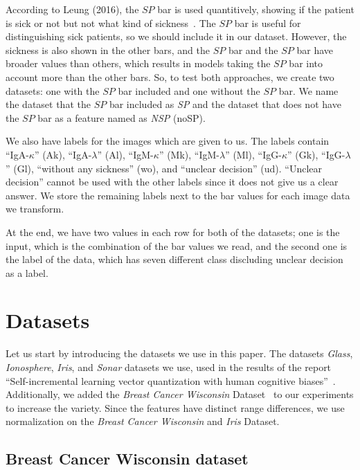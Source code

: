 According to Leung (2016), the $SP$ bar is used quantitively, showing if the patient is sick or not but not what kind of sickness~\cite{leung}. The $SP$ bar is useful for distinguishing sick patients, so we should include it in our dataset. However, the sickness is also shown in the other bars, and the $SP$ bar and the $SP$ bar have broader values than others, which results in models taking the $SP$ bar into account more than the other bars. So, to test both approaches, we create two datasets: one with the $SP$ bar included and one without the $SP$ bar. We name the dataset that the $SP$ bar included as \textit{SP} and the dataset that does not have the $SP$ bar as a feature named as \textit{NSP} (noSP).

We also have labels for the images which are given to us. The labels contain “IgA-$\kappa$” (Ak), “IgA-$\lambda$” (Al), “IgM-$\kappa$” (Mk), “IgM-$\lambda$” (Ml), “IgG-$\kappa$” (Gk), “IgG-$\lambda$” (Gl), “without any sickness” (wo), and “unclear decision” (ud). “Unclear decision” cannot be used with the other labels since it does not give us a clear answer. We store the remaining labels next to the bar values for each image data we transform.

At the end, we have two values in each row for both of the datasets; one is the input, which is the combination of the bar values we read, and the second one is the label of the data, which has seven different class discluding unclear decision as a label.

\section{Datasets}

Let us start by introducing the datasets we use in this paper. The datasets \textit{Glass}, \textit{Ionosphere}, \textit{Iris}, and \textit{Sonar} datasets we use, used in the results of the report “Self-incremental learning vector quantization with human cognitive biases”~\cite{lrimp}. Additionally, we added the \textit{Breast Cancer Wisconsin} Dataset~\cite{cancer} to our experiments to increase the variety. Since the features have distinct range differences, we use normalization on the \textit{Breast Cancer Wisconsin} and \textit{Iris} Dataset.

\subsection{Breast Cancer Wisconsin dataset}

